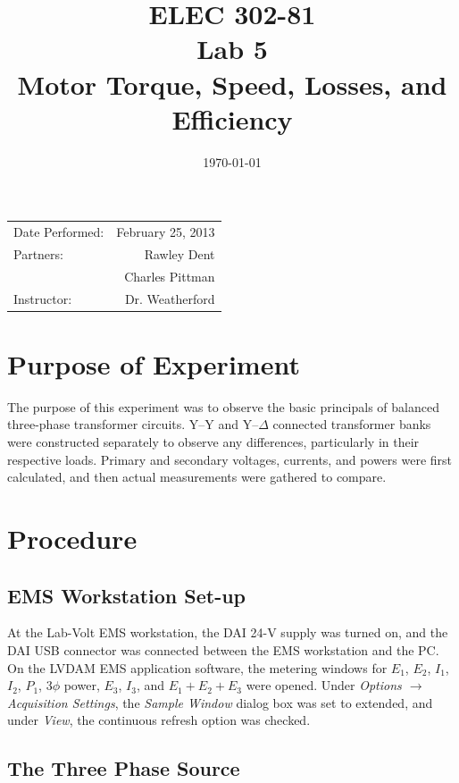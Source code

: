 \documentclass{article}
\author{}
\title{ELEC 302-81\\ Lab 5\\ Motor Torque, Speed, Losses, and Efficiency}
\date{\today}
\begin{document}
\maketitle

\begin{center}
  \begin{tabular}{lr}
    Date Performed: & February 25, 2013 \\
    Partners: & Rawley Dent \\
              & Charles Pittman \\
    Instructor: & Dr. Weatherford
  \end{tabular}
\end{center}

\pagebreak

\setlength\parindent{0pt}

\section{Purpose of Experiment}

The purpose of this experiment was to observe the basic principals of balanced
three-phase transformer circuits. Y--Y and Y--$\Delta$ connected transformer
banks were constructed separately to observe any differences, particularly in
their respective loads. Primary and secondary voltages, currents, and powers
were first calculated, and then actual measurements were gathered to compare.

\section{Procedure}

\subsection{EMS Workstation Set-up}

At the Lab-Volt EMS workstation, the DAI 24-V supply was turned on, and the DAI
USB connector was connected between the EMS workstation and the {PC}. On the
LVDAM EMS application software, the metering windows for $E_1$, $E_2$, $I_1$,
$I_2$, $P_1$, 3$\phi$ power, $E_3$, $I_3$, and $E_1 + E_2 + E_3$ were
opened.  Under \emph{Options $\to$ Acquisition Settings}, the \emph{Sample
Window} dialog box was set to extended, and under \emph{View}, the
continuous refresh option was checked.

\subsection{The Three Phase Source}
\end{document}
